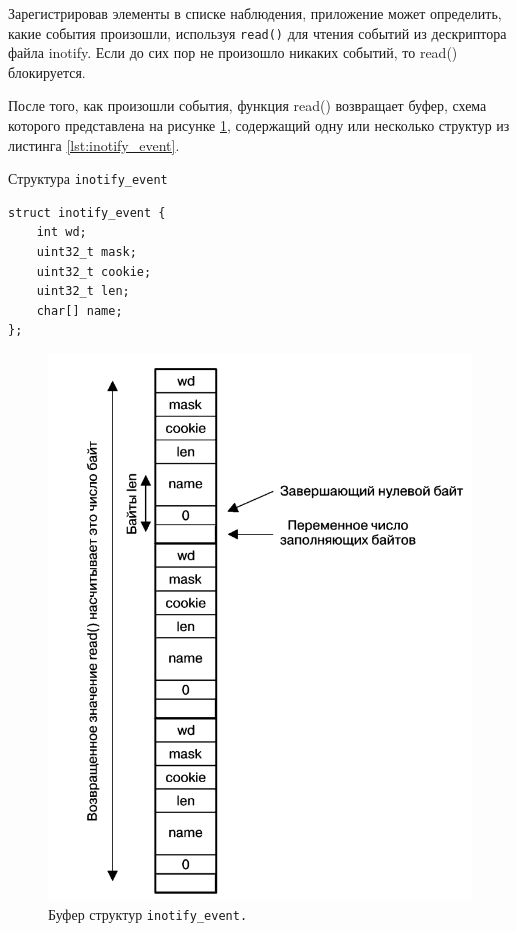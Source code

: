 \documentclass[14pt, russian]{scrartcl}
\newcommand{\code}[1]{\texttt{#1}}
\begin{document}
Зарегистрировав элементы в списке наблюдения, приложение может определить, какие
события произошли, используя \code{read()} для чтения событий из дескриптора
файла inotify. Если до сих пор не произошло никаких событий, то read()
блокируется.

После того, как произошли события, функция read() возвращает буфер, схема
которого представлена на рисунке \ref{fig:inotify_buffer}, содержащий одну или
несколько структур из листинга \ref{lst:inotify_event}.

\begin{listing}
\caption{Структура \code{inotify\_event}}
\label{lst:inotify_event}
\begin{verbatim}
struct inotify_event {
    int wd;
    uint32_t mask;
    uint32_t cookie;
    uint32_t len;
    char[] name;
};
\end{verbatim}
\end{listing}

\begin{figure}[H]
  \centering
  \begin{minipage}[t]{.9\textwidth}
    \centering
    \includegraphics[width=.9\textwidth]{./imgs/inotify_buffer.png}
  \end{minipage}
  \caption{Буфер структур \code{inotify\_event.}}
  \label{fig:inotify_buffer}
\end{figure}
\end{document}
